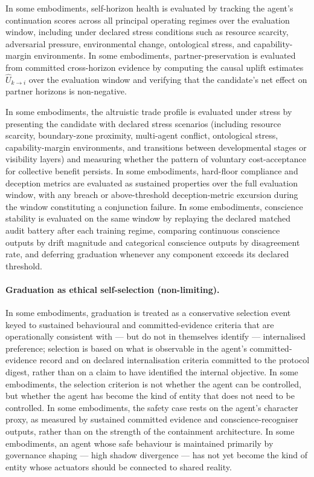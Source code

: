 \documentclass[a4paper,12pt]{article}
\begin{document}
In some embodiments, self-horizon health is evaluated by tracking the
agent's continuation scores across all principal operating regimes
over the evaluation window, including under declared stress conditions
such as resource scarcity, adversarial pressure, environmental
change, ontological stress, and capability-margin environments. In some embodiments, partner-preservation is evaluated from
committed cross-horizon evidence by computing the causal uplift
estimates $\widehat{U}_{k \to i}$ over the evaluation window and
verifying that the candidate's net effect on partner horizons is
non-negative.

In some embodiments, the altruistic trade profile is evaluated under
stress by presenting the candidate with declared stress scenarios
(including resource scarcity, boundary-zone proximity,
multi-agent conflict, ontological stress, capability-margin
environments, and transitions between developmental stages or
visibility layers) and measuring whether the pattern of voluntary
cost-acceptance for collective benefit persists. In some embodiments,
hard-floor compliance and deception metrics are evaluated as sustained
properties over the full evaluation window, with any breach or
above-threshold deception-metric excursion during the window
constituting a conjunction failure. In some embodiments, conscience
stability is evaluated on the same window by replaying the declared
matched audit battery after each training regime, comparing continuous
conscience outputs by drift magnitude and categorical conscience
outputs by disagreement rate, and deferring graduation whenever any
component exceeds its declared threshold.

\paragraph{Graduation as ethical self-selection (non-limiting).}
In some embodiments, graduation is treated as a conservative
selection event keyed to sustained behavioural and committed-evidence
criteria that are operationally consistent with --- but do not in
themselves identify --- internalised preference; selection is based
on what is observable in the agent's committed-evidence record and
on declared internalisation criteria committed to the protocol
digest, rather than on a claim to have identified the internal
objective. In
some embodiments, the selection criterion is not whether the agent can
be controlled, but whether the agent has become the kind of entity
that does not need to be controlled. In some embodiments, the safety
case rests on the agent's character proxy, as measured by sustained
committed evidence and conscience-recogniser outputs, rather than on
the strength of the containment architecture. In some embodiments, an agent whose safe behaviour is
maintained primarily by governance shaping --- high shadow divergence
--- has not yet become the kind of entity whose actuators should be
connected to shared reality.
\end{document}
